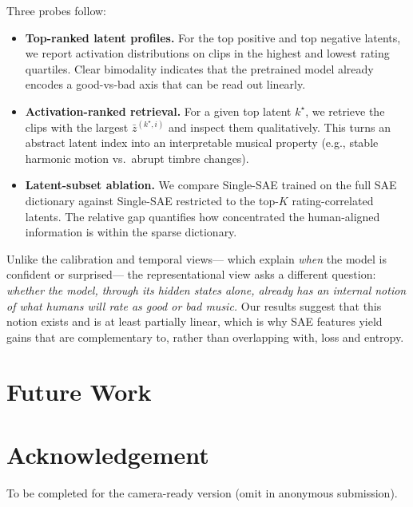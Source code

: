 \documentclass{article}
\begin{document}
Three probes follow:
\begin{itemize}
  \item \textbf{Top-ranked latent profiles.}
    For the top positive and top negative latents,
    we report activation distributions
    on clips in the highest and lowest rating quartiles.
    Clear bimodality indicates that the pretrained model
    already encodes a good-vs-bad axis that can be read out linearly.
  \item \textbf{Activation-ranked retrieval.}
    For a given top latent $k^\star$,
    we retrieve the clips with the largest $\bar{z}^{(k^\star,i)}$
    and inspect them qualitatively.
    This turns an abstract latent index
    into an interpretable musical property
    (e.g., stable harmonic motion vs.\ abrupt timbre changes).
  \item \textbf{Latent-subset ablation.}
    We compare Single-SAE trained on the full SAE dictionary
    against Single-SAE restricted to the top-$K$ rating-correlated latents.
    The relative gap quantifies how concentrated
    the human-aligned information is within the sparse dictionary.
\end{itemize}

Unlike the calibration and temporal views---%
which explain \emph{when} the model is confident or surprised---%
the representational view asks a different question:
\emph{whether the model, through its hidden states alone,
already has an internal notion of what humans will rate as good or bad music.}
Our results suggest that this notion exists and is at least partially linear,
which is why SAE features yield gains that are complementary to,
rather than overlapping with, loss and entropy.

\section{Future Work}

\section{Acknowledgement}

To be completed for the camera-ready version (omit in anonymous submission).


\end{document}

